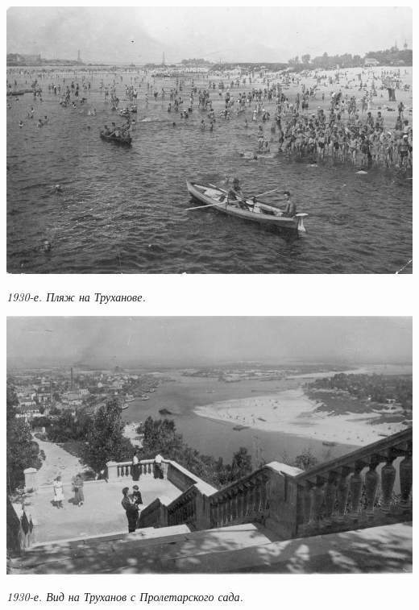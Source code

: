 \vspace*{\fill}
\newpage
\vspace*{\fill}
\begin{center}
\includegraphics[width=\linewidth]{chast-gorodki/cherto/tru01.jpg}

\textit{1930-е. Пляж на Труханове.}
\end{center}


\begin{center}
\includegraphics[width=\linewidth]{chast-gorodki/cherto/tru02.jpg}

\textit{1930-е. Вид на Труханов с Пролетарского сада.}
\end{center}

